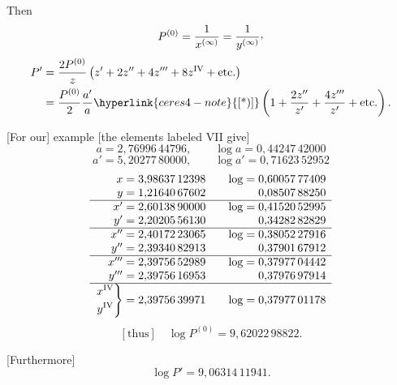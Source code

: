 \hypertarget{native-391}{}Then
\[
P^{(0)}=\frac1{x^{(\infty)}}=\frac1{y^{(\infty)}}\mathpunct{\text{\raisebox{.45ex}{,}}}
\]
\[
\begin{aligned}
P'&=\frac{2P^{(0)}}z\left(z'+2z''+4z'''+8z^{\mathrm{IV}}+\text{etc.}\right)\\
&=\frac{P^{(0)}}2\frac{a'}a\hyperlink{ceres4-note}{\text{[*)]}}\left(1+\frac{2z''}{z'}+\frac{4z'''}{z'}+\text{etc.}\right).
\end{aligned}
\]
\begingroup
\makeatletter
\long\def\@makefntext#1{\noindent[*)] #1}
\makeatother
{}
\endgroup

[For our] example [the elements labeled VII give]
\[
a=2{,}76996\,44796,\qquad\log a=0{,}44247\,42000
\]
\noindent[and]
\[
a'=5{,}20277\,80000,\qquad\log a'=0{,}71623\,52952
\]
\[
\begin{array}{r@{\;}l@{\qquad}r@{\;}l}
x&=3{,}98637\,12398&\log=&0{,}60057\,77409\\
y&=1{,}21640\,67602&&0{,}08507\,88250\\\hline
x'&=2{,}60138\,90000&\log=&0{,}41520\,52995\\
y'&=2{,}20205\,56130&&0{,}34282\,82829\\\hline
x''&=2{,}40172\,23065&\log=&0{,}38052\,27916\\
y''&=2{,}39340\,82913&&0{,}37901\,67912\\\hline
x'''&=2{,}39756\,52989&\log=&0{,}37977\,04442\\
y'''&=2{,}39756\,16953&&0{,}37976\,97914\\\hline
\left.\begin{gathered}x^{\mathrm{IV}}\\y^{\mathrm{IV}}\end{gathered}\right\}&=2{,}39756\,39971&\log=&0{,}37977\,01178
\end{array}
\]
\[
[\text{thus}]\quad\log P^{(0)}=9{,}62022\,98822.
\]

[Furthermore]
\[
\log P'=9{,}06314\,11941.
\]

